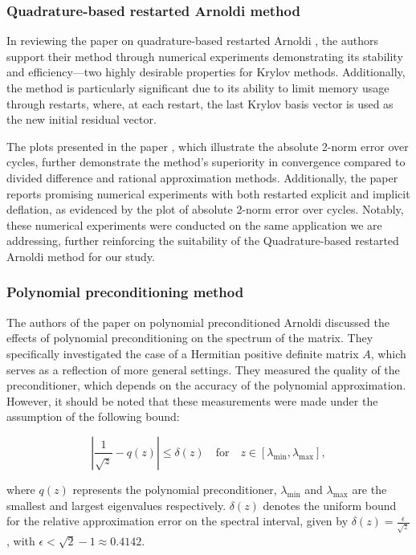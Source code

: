 \subsubsection{Quadrature-based restarted Arnoldi method}
\label{sec:quad_restarted_arnoldi}

In reviewing the paper on quadrature-based restarted Arnoldi \cite{52}, the authors support their method through numerical experiments demonstrating its stability and efficiency—two highly desirable properties for Krylov methods. Additionally, the method is particularly significant due to its ability to limit memory usage through restarts, where, at each restart, the last Krylov basis vector is used as the new initial residual vector.

The plots presented in the paper \cite{52}, which illustrate the absolute 2-norm error over cycles, further demonstrate the method's superiority in convergence compared to divided difference and rational approximation methods. Additionally, the paper reports promising numerical experiments with both restarted explicit and implicit deflation, as evidenced by the plot of absolute 2-norm error over cycles. Notably, these numerical experiments were conducted on the same application we are addressing, further reinforcing the suitability of the Quadrature-based restarted Arnoldi method for our study.

\subsubsection{Polynomial preconditioning method}
\label{sec:poly_precond_method}

The authors of the paper \cite{49} on polynomial preconditioned Arnoldi discussed the effects of polynomial preconditioning on the spectrum of the matrix. They specifically investigated the case of a Hermitian positive definite matrix $A$, which serves as a reflection of more general settings. They measured the quality of the preconditioner, which depends on the accuracy of the polynomial approximation. However, it should be noted that these measurements were made under the assumption of the following bound:

\[
  \left|\frac{1}{\sqrt{z}} - q(z)\right| \leq \delta(z) \quad \text{for} \quad z \in [\lambda_{\min}, \lambda_{\max}],
\]

where $q(z)$ represents the polynomial preconditioner, $\lambda_{\min}$ and $\lambda_{\max}$ are the smallest and largest eigenvalues respectively. $\delta(z)$ denotes the uniform bound for the relative approximation error on the spectral interval, given by $\delta(z)=\frac{\epsilon}{\sqrt{z}}$, with $\epsilon < \sqrt{2} - 1 \approx 0.4142$.


